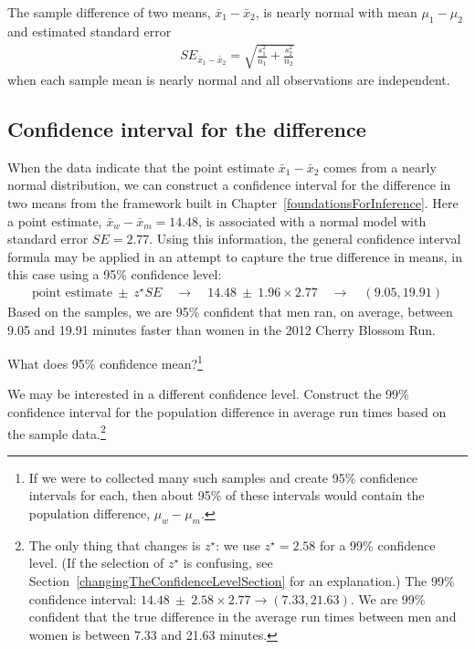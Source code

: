 
\begin{termBox}{
The sample difference of two means, $\bar{x}_1 - \bar{x}_2$, is nearly normal with mean $\mu_{1}-\mu_{2}$ and estimated standard error
\begin{eqnarray}
\textstyle
SE_{\bar{x}_{1} - \bar{x}_{2}} = \sqrt{\frac{s_1^2}{n_1} + \frac{s_2^2}{n_2}}
\label{seOfDifferenceInMeans}
\end{eqnarray}
when each sample mean is nearly normal and all observations are independent.}
\end{termBox}

\subsection{Confidence interval for the difference}

When the data indicate that the point estimate $\bar{x}_{1} - \bar{x}_{2}$ comes from a nearly normal distribution, we can construct a confidence interval for the difference in two means from the framework built in Chapter~\ref{foundationsForInference}. Here a point estimate, $\bar{x}_{w} - \bar{x}_{m} = 14.48$, is associated with a normal model with standard error $SE=2.77$. Using this information, the general confidence interval formula may be applied in an attempt to capture the true difference in means, in this case using a 95\% confidence level:
\begin{eqnarray*}
\text{point estimate}\  \pm \ z^{\star}SE \quad\to\quad 14.48\  \pm \ 1.96\times 2.77 \quad\to\quad (9.05, 19.91)
\end{eqnarray*}
Based on the samples, we are 95\% confident that men ran, on average, between 9.05 and 19.91 minutes faster than women in the 2012 Cherry Blossom Run.

\begin{exercise}
What does 95\% confidence mean?\footnote{If we were to collected many such samples and create 95\% confidence intervals for each, then about 95\% of these intervals would contain the population difference, $\mu_w - \mu_m$.}
\end{exercise}

\begin{exercise}
We may be interested in a different confidence level. Construct the 99\% confidence interval for the population difference in average run times based on the sample data.\footnote{The only thing that changes is $z^{\star}$: we use $z^{\star}=2.58$ for a 99\% confidence level. (If the selection of $z^{\star}$ is confusing, see Section~\ref{changingTheConfidenceLevelSection} for an explanation.) The 99\% confidence interval: $14.48\ \pm\ 2.58\times 2.77 \to(7.33, 21.63)$. We are 99\% confident that the true difference in the average run times between men and women is between 7.33 and 21.63 minutes.}


\end{exercise}

